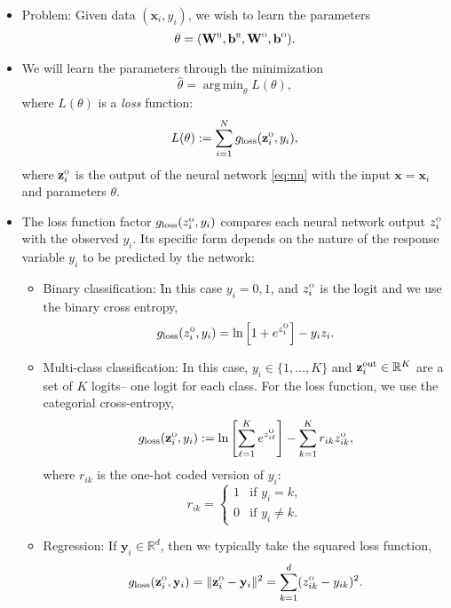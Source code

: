 \documentclass[11pt]{article}
\def\beq{\begin{equation}}
\def\eeq{\end{equation}}
\def\R{{\mathbb{R}}}
\def\argmin{\mathop{\mathrm{arg\,min}}}
\newcommand{\bbf}{\mathbf{b}}
\newcommand{\xbf}{\mathbf{x}}
\newcommand{\ybf}{\mathbf{y}}
\newcommand{\zbf}{\mathbf{z}}
\newcommand{\Wbf}{\mathbf{W}}
\def\hid{\textsc{\tiny H}}
\def\out{\textsc{\tiny O}}
\begin{document}
\begin{itemize}
\item Problem:  Given data $(\xbf_i,y_i)$, we wish to learn the parameters
\beq \label{eq:thetann}
    \theta = (\Wbf^\hid,\bbf^\hid,\Wbf^\out,\bbf^\out).
\eeq
\item We will learn the parameters through the minimization
\beq \label{eq:thetamin}
    \hat{\theta} = \argmin_{\theta} L(\theta),
\eeq
where $L(\theta)$ is a \emph{loss} function:
\beq \label{eq:Ltheta}
    L(\theta) := \sum_{i=1}^N g_{\rm loss}(\zbf_i^\out,y_i),
\eeq
where $\zbf_i^\out$ is the output of the neural network \eqref{eq:nn} with the input
$\xbf=\xbf_i$ and parameters $\theta$.

\item The loss function factor $g_{\rm loss}(z^\out_i,y_i)$ compares each
neural network output $z^\out_i$ with the observed $y_i$.  Its specific form
depends on the nature of the response variable $y_i$ to be predicted by the network:
\begin{itemize}
\item Binary classification:  In this case $y_i=0,1$,
and $z^\out_i$ is the logit and we use the binary cross entropy,
\beq \label{eq:gloss_bin}
    g_{\rm loss}(z^\out_i,y_i) = \ln\left[ 1 + e^{z_i^\out} \right] -y_iz_i.
\eeq

\item Multi-class classification:  In this case, $y_i \in \{1,\ldots,K\}$
and $\zbf_i^{\rm out} \in \R^K$ are a set of $K$ logits-- one logit for each class.
For the loss function, we use the categorial cross-entropy,
\beq \label{eq:gloss_mc}
    g_{\rm loss}(\zbf^\out_i,y_i) :=
    \ln\left[ \sum_{\ell=1}^K e^{z^\out_{i\ell}} \right] -
        \sum_{k=1}^K r_{ik}z^\out_{ik},
\eeq
where $r_{ik}$ is the one-hot coded version of $y_i$:
\beq \label{eq:rik}
    r_{ik} = \begin{cases}
        1 & \mbox{if } y_i = k, \\
        0 & \mbox{if } y_i \neq k.
        \end{cases}
\eeq

\item Regression:  If $\ybf_i \in \R^d$, then we typically take the squared loss function,
\beq \label{eq:gloss_square}
    g_{\rm loss}(\zbf^\out_i,\ybf_i) = \|\zbf^\out_i-\ybf_i\|^2
        = \sum_{k=1}^d (z^\out_{ik} - y_{ik})^2.
\eeq
\end{itemize}


\end{itemize}
\end{document}
